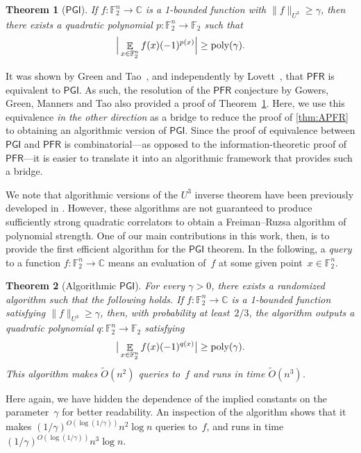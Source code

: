 \documentclass[11pt]{amsart}
\newcommand{\Exp}{\mathop{\mathbb{E}}}
\newcommand{\C}{\mathbb{C}} %
\newcommand{\F}{\mathbb{F}} %
\newcommand{\PFR}{\textsf{PFR}}
\newcommand{\PGI}{\textsf{PGI}}
\newcommand{\poly}{\mbox{\rm poly}}
\theoremstyle{plain}
\newtheorem{theorem}{Theorem}[section]
\theoremstyle{definition}
\theoremstyle{remark}
\begin{document}
\begin{theorem}[$\PGI$]\label{thm:pgi}
    If $f:\F_2^n\to\C$ is a 1-bounded function with $\|f\|_{U^3} \geq \gamma$, then there exists a quadratic polynomial $p:\F_2^n\to\F_2$ such that
    \begin{equation*}
        \Big|\Exp_{x\in \F_2^n}f(x)(-1)^{p(x)}\Big| \geq \poly(\gamma).
    \end{equation*}
\end{theorem}

It was shown by Green and Tao~\cite{green2010equivalence}, and independently by Lovett~\cite{lovett2012equivalence}, that $\PFR$ is equivalent to $\PGI$.
As such, the resolution of the $\PFR$ conjecture by Gowers, Green, Manners and Tao also provided a proof of Theorem~\ref{thm:pgi}.
Here, we use this equivalence \emph{in the other direction} as a bridge to reduce the proof of \cref{thm:APFR} to obtaining an algorithmic version of $\PGI$.
Since the proof of equivalence between $\PGI$ and $\PFR$ is combinatorial---as opposed to the information-theoretic proof of $\PFR$---it is easier to translate it into an algorithmic framework that provides such a bridge.

We note that algorithmic versions of the $U^3$ inverse theorem have been previously developed in \cite{TulsianiW2014, ben2014sampling}.
However, these algorithms are not guaranteed to produce sufficiently strong quadratic correlators to obtain a Freiman--Ruzsa algorithm of polynomial strength.
One of our main contributions in this work, then, is  to provide the first efficient algorithm for the $\PGI$ theorem.
In the following, a \emph{query} to a function $f:\F_2^n\to\C$ means an evaluation of~$f$ at some given point~$x\in \F_2^n$.

\begin{theorem}[Algorithmic $\PGI$] \label{thm:algoPGI}
    For every $\gamma>0$,  there exists a randomized algorithm such that the following holds. 
    If $f: \F_2^n \to \C$ is a 1-bounded function satisfying $\|f\|_{U^3} \geq \gamma$, then, with probability at least~$2/3$, the algorithm outputs a quadratic polynomial $q: \F_2^n \to \F_2$ satisfying
    \begin{equation*}
    \big|\Exp_{x\in \F_2^n} f(x) (-1)^{q(x)}\big| \geq \poly(\gamma).
    \end{equation*}
    This algorithm makes $\widetilde{O}(n^2)$ queries to~$f$ and runs in time $\widetilde{O}(n^3)$.
\end{theorem}

Here again, we have hidden the dependence of the implied constants on the parameter~$\gamma$ for better readability. An inspection of the algorithm shows that it makes $(1/\gamma)^{O(\log(1/\gamma))} n^2 \log n$ queries to~$f$, and runs in time $(1/\gamma)^{O(\log(1/\gamma))} n^3 \log n$.
\end{document}
